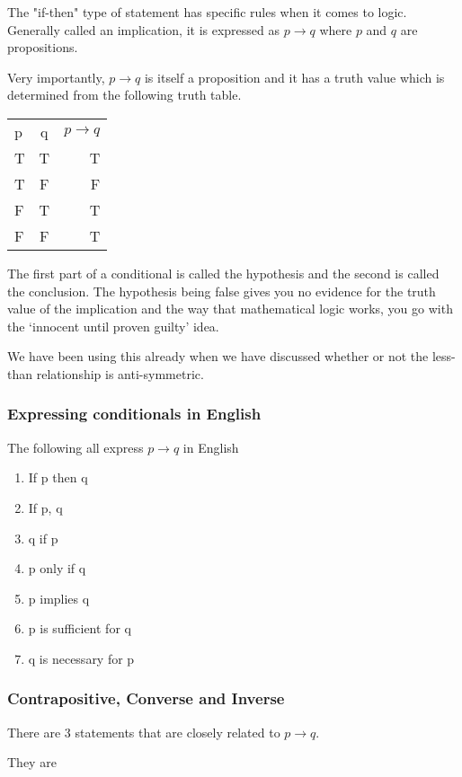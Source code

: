 \documentclass[12pt]{article}
\begin{document}
The "if-then" type of statement has specific rules when it comes to logic. Generally called an implication, it is expressed as $p \rightarrow q$ where $p$ and $q$ are propositions.

Very importantly, $p \rightarrow q$ is itself a proposition and it has a truth value which is determined from the following truth table.

\begin{tabular} {l c r}
p & q & $p \rightarrow q$ \\
T & T & T \\
T & F & F \\
F & T & T \\
F & F & T
\end{tabular}

The first part of a conditional is called the hypothesis and the second is called the conclusion. The hypothesis being false gives you no evidence for the truth value of the implication and the way that mathematical logic works, you go with the `innocent until proven guilty' idea. 

We have been using this already when we have discussed whether or not the less-than relationship is anti-symmetric. 

\subsubsection*{Expressing conditionals in English}

The following all express $p \rightarrow q$ in English

\begin{enumerate}
\item If p then q
\item If p, q
\item q if p
\item p only if q
\item p implies q
\item p is sufficient for q
\item q is necessary for p
\end{enumerate}

\subsubsection*{Contrapositive, Converse and Inverse}

There are 3 statements that are closely related to $p \rightarrow q$.

They are 
\end{document}
